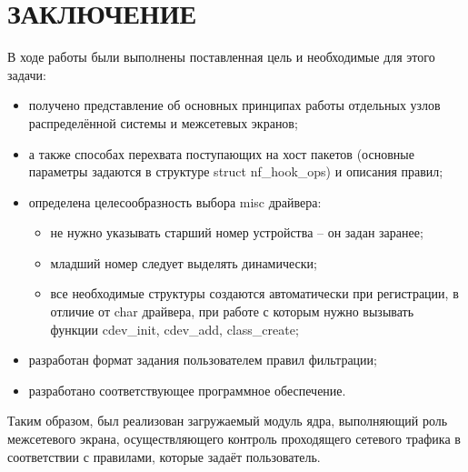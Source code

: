 \section*{ЗАКЛЮЧЕНИЕ}

В ходе работы были выполнены поставленная цель и необходимые для этого задачи:
\begin{itemize}
	\item получено представление об основных принципах работы отдельных узлов распределённой системы и межсетевых экранов;

	\item а также способах перехвата поступающих на хост пакетов (основные параметры задаются в структуре struct nf\_hook\_ops) и описания правил;
	
	\item определена целесообразность выбора misc драйвера:
	\begin{itemize}
		\item не нужно указывать старший номер устройства -- он задан заранее;
		
		\item младший номер следует выделять динамически;
		
		\item все необходимые структуры создаются автоматически при регистрации, в отличие от char драйвера, при работе с которым нужно вызывать функции cdev\_init, cdev\_add, class\_create;
	\end{itemize}

	\item разработан формат задания пользователем правил фильтрации;
	
	\item разработано соответствующее программное обеспечение.\newline
\end{itemize}

Таким образом, был реализован загружаемый модуль ядра, выполняющий роль межсетевого экрана, осуществляющего контроль проходящего сетевого трафика в соответствии с правилами, которые задаёт пользователь. 

\pagebreak